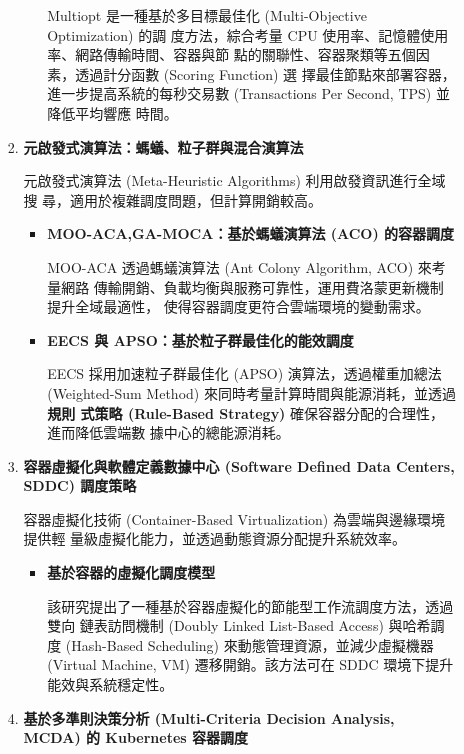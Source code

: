 \documentclass[12pt,a4paper]{article}
\begin{document}
\begin{enumerate}[label={(\zhdig*)}, leftmargin=2\parindent, listparindent=\parindent]
\begin{enumerate}[label={(\arabic*)}, leftmargin=\parindent, listparindent=\parindent]
\begin{enumerate}[label={(\zhdig*)}, leftmargin=\parindent, listparindent=\parindent]
\begin{itemize}[leftmargin=\parindent, listparindent=\parindent]
    Multiopt 是一種基於多目標最佳化 (Multi-Objective Optimization) 的調
    度方法，綜合考量 CPU 使用率、記憶體使用率、網路傳輸時間、容器與節
    點的關聯性、容器聚類等五個因素，透過計分函數 (Scoring Function) 選
    擇最佳節點來部署容器，進一步提高系統的每秒交易數 (Transactions Per Second, TPS) 並降低平均響應
    時間。

\end{itemize}
\item \textbf{
    元啟發式演算法：螞蟻、粒子群與混合演算法
}

元啟發式演算法 (Meta-Heuristic Algorithms) 利用啟發資訊進行全域搜
尋，適用於複雜調度問題，但計算開銷較高。
\begin{itemize}[leftmargin=\parindent, listparindent=\parindent]
    \item \textbf{\cite{14} MOO-ACA,GA-MOCA：基於螞蟻演算法 (ACO) 的容器調度}

    MOO-ACA 透過螞蟻演算法 (Ant Colony Algorithm, ACO) 來考量網路
    傳輸開銷、負載均衡與服務可靠性，運用費洛蒙更新機制提升全域最適性，
    使得容器調度更符合雲端環境的變動需求。

    \item \textbf{
        \cite{15} EECS 與 APSO：基於粒子群最佳化的能效調度
    }

    EECS 採用加速粒子群最佳化 (APSO) 演算法，透過權重加總法
    (Weighted-Sum Method) 來同時考量計算時間與能源消耗，並透過\textbf{規則
    式策略 (Rule-Based Strategy) }確保容器分配的合理性，進而降低雲端數
    據中心的總能源消耗。

\end{itemize}
\item \textbf{
    容器虛擬化與軟體定義數據中心 (Software Defined Data Centers, SDDC) 調度策略
}

容器虛擬化技術 (Container-Based Virtualization) 為雲端與邊緣環境提供輕
量級虛擬化能力，並透過動態資源分配提升系統效率。
\begin{itemize}[leftmargin=\parindent, listparindent=\parindent]
    \item \textbf{\cite{16} 基於容器的虛擬化調度模型}

    該研究提出了一種基於容器虛擬化的節能型工作流調度方法，透過雙向
    鏈表訪問機制 (Doubly Linked List-Based Access) 與哈希調度 (Hash-Based
    Scheduling) 來動態管理資源，並減少虛擬機器(Virtual Machine, VM) 遷移開銷。該方法可在 SDDC 環境下提升能效與系統穩定性。

\end{itemize}
\item \textbf{基於多準則決策分析 (Multi-Criteria Decision Analysis, MCDA) 的 Kubernetes 容器調度}


\end{enumerate}
\end{enumerate}
\end{enumerate}
\end{document}
